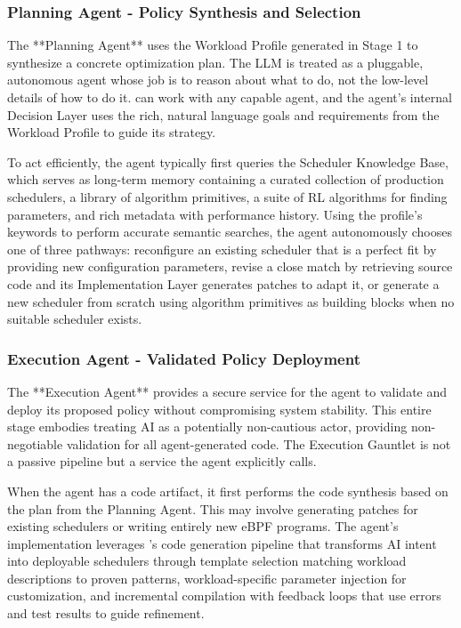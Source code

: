 \subsubsection{Planning Agent - Policy Synthesis and Selection}

The **Planning Agent** uses the Workload Profile generated in Stage 1 to synthesize a concrete optimization plan. The LLM is treated as a pluggable, autonomous agent whose job is to reason about what to do, not the low-level details of how to do it. \sys can work with any capable agent, and the agent's internal Decision Layer uses the rich, natural language goals and requirements from the Workload Profile to guide its strategy.

To act efficiently, the agent typically first queries the Scheduler Knowledge Base, which serves as long-term memory containing a curated collection of production schedulers, a library of algorithm primitives, a suite of RL algorithms for finding parameters, and rich metadata with performance history. Using the profile's keywords to perform accurate semantic searches, the agent autonomously chooses one of three pathways: reconfigure an existing scheduler that is a perfect fit by providing new configuration parameters, revise a close match by retrieving source code and its Implementation Layer generates patches to adapt it, or generate a new scheduler from scratch using algorithm primitives as building blocks when no suitable scheduler exists.

\subsubsection{Execution Agent - Validated Policy Deployment}

The **Execution Agent** provides a secure service for the agent to validate and deploy its proposed policy without compromising system stability. This entire stage embodies treating AI as a potentially non-cautious actor, providing non-negotiable validation for all agent-generated code. The Execution Gauntlet is not a passive pipeline but a service the agent explicitly calls.

When the agent has a code artifact, it first performs the code synthesis based on the plan from the Planning Agent. This may involve generating patches for existing schedulers or writing entirely new eBPF programs. The agent's implementation leverages \sys's code generation pipeline that transforms AI intent into deployable schedulers through template selection matching workload descriptions to proven patterns, workload-specific parameter injection for customization, and incremental compilation with feedback loops that use errors and test results to guide refinement.

